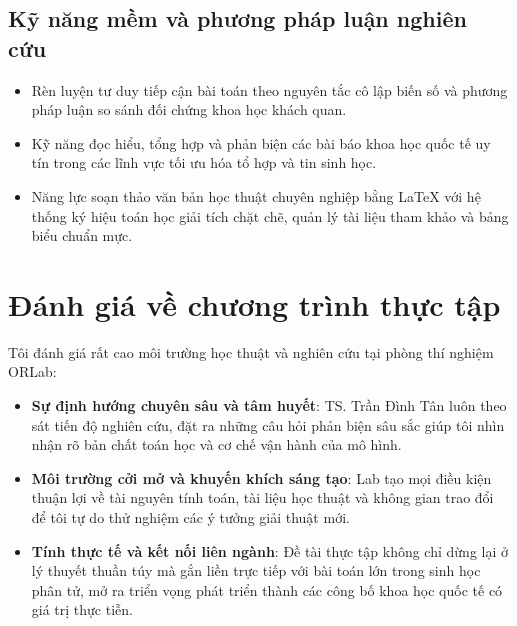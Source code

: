 \subsection{Kỹ năng mềm và phương pháp luận nghiên cứu}
\begin{itemize}
    \item Rèn luyện tư duy tiếp cận bài toán theo nguyên tắc cô lập biến số và phương pháp luận so sánh đối chứng khoa học khách quan.
    \item Kỹ năng đọc hiểu, tổng hợp và phản biện các bài báo khoa học quốc tế uy tín trong các lĩnh vực tối ưu hóa tổ hợp và tin sinh học.
    \item Năng lực soạn thảo văn bản học thuật chuyên nghiệp bằng LaTeX với hệ thống ký hiệu toán học giải tích chặt chẽ, quản lý tài liệu tham khảo và bảng biểu chuẩn mực.
\end{itemize}

\section{Đánh giá về chương trình thực tập}
\label{sec:danh_gia_moi_truong_orlab}

Tôi đánh giá rất cao môi trường học thuật và nghiên cứu tại phòng thí nghiệm ORLab:
\begin{itemize}
    \item \textbf{Sự định hướng chuyên sâu và tâm huyết}: TS. Trần Đình Tân luôn theo sát tiến độ nghiên cứu, đặt ra những câu hỏi phản biện sâu sắc giúp tôi nhìn nhận rõ bản chất toán học và cơ chế vận hành của mô hình.
    \item \textbf{Môi trường cởi mở và khuyến khích sáng tạo}: Lab tạo mọi điều kiện thuận lợi về tài nguyên tính toán, tài liệu học thuật và không gian trao đổi để tôi tự do thử nghiệm các ý tưởng giải thuật mới.
    \item \textbf{Tính thực tế và kết nối liên ngành}: Đề tài thực tập không chỉ dừng lại ở lý thuyết thuần túy mà gắn liền trực tiếp với bài toán lớn trong sinh học phân tử, mở ra triển vọng phát triển thành các công bố khoa học quốc tế có giá trị thực tiễn.
\end{itemize}
